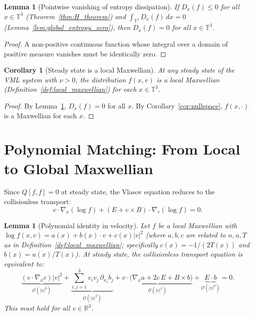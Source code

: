 \documentclass[11pt]{article}
\newcommand{\R}{\mathbb{R}}
\newcommand{\T}{\mathbb{T}}
\newtheorem{lemma}[theorem]{Lemma}
\newtheorem{corollary}[theorem]{Corollary}
\begin{document}
\begin{lemma}[Pointwise vanishing of entropy dissipation]
\label{lem:pointwise_D_zero}
If $D_x(f) \leq 0$ for all $x \in \T^3$ (Theorem~\ref{thm:H_theorem}) and $\int_{\T^3} D_x(f) \, dx = 0$ (Lemma~\ref{lem:global_entropy_zero}), then $D_x(f) = 0$ for all $x \in \T^3$.
\end{lemma}

\begin{proof}
A non-positive continuous function whose integral over a domain of positive measure vanishes must be identically zero.
\end{proof}

\begin{corollary}[Steady state is a local Maxwellian]
\label{cor:local_maxwellian}
At any steady state of the VML system with $\nu > 0$, the distribution $f(x, v)$ is a local Maxwellian (Definition~\ref{def:local_maxwellian}) for each $x \in \T^3$.
\end{corollary}

\begin{proof}
By Lemma~\ref{lem:pointwise_D_zero}, $D_x(f) = 0$ for all $x$. By Corollary~\ref{cor:nullspace}, $f(x, \cdot)$ is a Maxwellian for each $x$.
\end{proof}

\section{Polynomial Matching: From Local to Global Maxwellian}
\label{sec:polynomial}

Since $Q[f,f] = 0$ at steady state, the Vlasov equation reduces to the collisionless transport:
\[
v \cdot \nabla_x(\log f) + (E + v \times B) \cdot \nabla_v(\log f) = 0.
\]

\begin{lemma}[Polynomial identity in velocity]
\label{lem:polynomial_identity}
Let $f$ be a local Maxwellian with $\log f(x,v) = a(x) + b(x) \cdot v + c(x)|v|^2$ (where $a, b, c$ are related to $n, u, T$ as in Definition~\ref{def:local_maxwellian}; specifically $c(x) = -1/(2T(x))$ and $b(x) = u(x)/T(x)$). At steady state, the collisionless transport equation is equivalent to:
\begin{equation}
\label{eq:polynomial}
\underbrace{(v \cdot \nabla_x c)|v|^2}_{\mathcal{O}(|v|^3)} + \underbrace{\sum_{i,j=1}^{3} v_i v_j \, \partial_{x_i} b_j}_{\mathcal{O}(|v|^2)} + \underbrace{v \cdot \big(\nabla_x a + 2c \, E + B \times b\big)}_{\mathcal{O}(|v|^1)} + \underbrace{E \cdot b}_{\mathcal{O}(|v|^0)} = 0.
\end{equation}
This must hold for all $v \in \R^3$.
\end{lemma}
\end{document}
